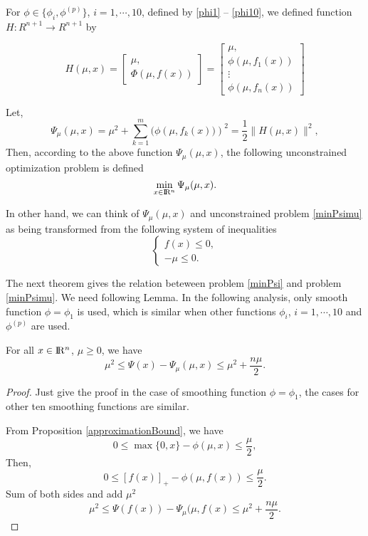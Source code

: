 \documentclass[12pt]{article}
\renewcommand{\Re}{{\rm I}\! {\rm R}}
\newcommand{\rn}{\Re^n}
\begin{document}
For $\phi \in \{\phi_i,\phi^{(p)}\}$, $i=1,\cdots,10$, defined 
by \eqref{phi1} -- \eqref{phi10},
 we defined function $H:R^{n+1} \rightarrow R^{n+1}$ by

\[
H(\mu,x)=\left[
    \begin{array}{c}
        \mu, \\
        \Phi(\mu,f(x))
    \end{array}
\right]=
    \left[
    \begin{array}{c}
        \mu, \\
        \phi(\mu,f_1(x))\\
        \vdots \\
        \phi(\mu,f_n(x))
    \end{array}
    \right]
\]


Let,
\begin{equation}\label{Psimu}
\Psi_\mu(\mu,x) = \mu^2+\sum_{k=1}^{m}(\phi\left(\mu,f_k(x))\right)^2
=\frac{1}{2}\| H(\mu, x ) \|^2 ,
\end{equation}
Then, according to the above function $\Psi_\mu(\mu,x)$, the following
 unconstrained optimization problem is defined
\begin{equation}\label{minPsimu}
\min_{x\in \rn} \Psi_\mu(\mu,x).
\end{equation}

In other hand, we can think of $\Psi_\mu(\mu,x)$ and unconstrained 
problem \eqref{minPsimu} as being transformed from the following system of inequalities
\begin{equation*}
\left\{
\begin{array}{c}
f(x) \leq 0, \\
-\mu \leq 0.
\end{array}
\right.
\end{equation*}

The next theorem gives the relation beteween problem \eqref{minPsi} and
problem \eqref{minPsimu}.
We need following Lemma. In the following analysis, only smooth 
function $\phi = \phi_1$ is used, which is similar when other 
functions  $\phi_i$, $i=1,\cdots,10$ and $\phi^{(p)}$ are used.

\begin{lemma}\label{lemma-bound}
For all $x \in \rn$, $\mu \geq 0$, we have
\begin{equation}
\mu^2 \leq \Psi(x) - \Psi_\mu(\mu,x) \leq \mu^2 +\frac{n\mu}{2}.
\end{equation}
\end{lemma}


\begin{proof}
Just give the proof in the case of smoothing function $\phi = \phi_1$, 
the cases for other ten smoothing functions are similar.

From Proposition \ref{approximationBound}, we have
$$
0 \leq \max\{0,x\} - \phi(\mu,x) \leq \frac{\mu}{2},
$$
Then,
$$
0 \leq [f(x)]_+  - \phi(\mu,f(x)) \leq \frac{\mu}{2}.
$$
Sum of both sides and add $\mu^2$
$$
\mu^2 \leq \Psi(f(x))  - \Psi_\mu(\mu,f(x) \leq \mu^2 +\frac{n\mu}{2}.
$$
\end{proof}
\end{document}
